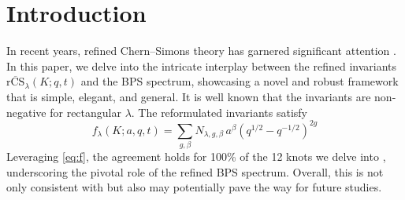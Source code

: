 \section{Introduction}
In recent years, refined Chern--Simons theory has garnered significant attention \cite{KN17}.
In this paper, we delve into the intricate interplay between the refined invariants
$\overline{\mathrm{rCS}}_\lambda(K; q, t)$ and the BPS spectrum, showcasing a novel and robust
framework that is simple, elegant, and general. It is well known that the invariants are
non-negative for rectangular $\lambda$. The reformulated invariants satisfy
\begin{equation}
  f_\lambda(K; a, q, t) = \sum_{g, \beta} \widehat N_{\lambda, g, \beta}\, a^\beta (q^{1/2} - q^{-1/2})^{2g}
  \label{eq:f}
\end{equation}
Leveraging \eqref{eq:f}, the agreement holds for 100\% of the 12 knots we delve into
\cite{Macdonald95, TODO-missing}, underscoring the pivotal role of the refined BPS spectrum.
Overall, this is not only consistent with \cite{KN17} but also may potentially pave the way for
future studies.
